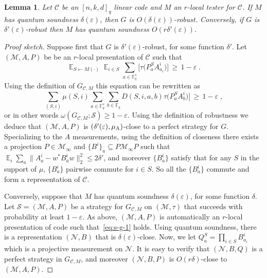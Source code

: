 \documentclass[11pt]{article}
\newtheorem{lemma}[theorem]{Lemma}
\theoremstyle{definition}
\newcommand{\code}{\mathcal{C}}
\newcommand{\strategy}{\mathscr{S}}
\DeclareMathOperator*{\Expectation}{\mathbb{E}}
\newcommand{\Es}[1]{\Expectation_{#1}}
\newcommand{\F}{\ensuremath{\mathbb{F}}}
\newcommand{\mM}{\ensuremath{\mathcal{M}}}
\newcommand{\eps}{\varepsilon}
\newcommand{\mN}{\mathcal{N}}
\newcommand{\labelstyle}[1]{\ensuremath{\textsc{#1}}\xspace}
\newcommand{\alice}{\labelstyle{A}}
\begin{document}

\begin{lemma}\label{lem:sound-game}
Let $\code$ be an $[n,k,d]_q$ linear code and $M$ an $r$-local tester for $\code$. 
If $M$ has quantum soundness $\delta(\eps)$, then $G$ is $O(\delta(\eps))$-robust. Conversely, if $G$ is $\delta'(\eps)$-robust then $M$ has quantum soundness $O(r\delta'(\eps))$. 
\end{lemma}

\begin{proof}[Proof sketch]
Suppose first that $G$ is $\delta'(\eps)$-robust, for some function $\delta'$. Let $(\mM,A,P)$ be be an $r$-local presentation of $\code$ such that 
\begin{equation}\label{eq:s-g-1}
\Es{S\leftarrow M(\cdot)} \Es{i\in S} \sum_{a\in \F_q^s} \big[ \tau\big(  P^S_a  A^i_{a_i}\big) \big] \,\geq \,1-\eps\;.
\end{equation}
Using the definition of $G_{\code,M}$ this equation can be rewritten as
\[ \sum_{(S,i)} \mu(S,i) \sum_{a\in \F_q^s}\sum_{b\in\F_q} D(S,i,a,b) \tau\big(  P^S_a  A^i_{b}\big) \big] \,\geq \,1-\eps\;,\]
or in other words $\omega(G_{\code,M};\strategy)\geq 1-\eps$. Using the definition of robustness we deduce that $(\mM,A,P)$ is $(\delta'(\eps),\mu_\alice)$-close to a perfect strategy for $G$. Specializing to the $A$ measurements, using the definition of closeness there exists a projection $P\in \mM_\infty$ and $\{B^i\}_a \subseteq P\mM_\infty P$ such that $\Es{i}\sum_a \|A^i_a-w^* B^i_a w \|_2^2 \leq 2\delta'$, and moreover $\{B^i_a\}$ satisfy that for any $S$ in the support of $\mu$, $\{B^i_a\}$ pairwise commute for $i\in S$. So all the $\{B^i_a\}$ commute and form a representation of $\code$. 

Conversely, suppose that $M$ has quantum soundness $\delta(\eps)$, for some function $\delta$.
Let $\strategy=(\mM,A,P)$ be a strategy for $G_{\code,M}$ on $(\mM,\tau)$ that succeeds with probability at least $1-\eps$. As above, $(\mM,A,P)$ is automatically an $r$-local presentation of code such that~\eqref{eq:s-g-1} holds. Using quantum soundness, there is a representation $(\mN,B)$ that is $\delta(\eps)$-close. Now, we let $Q^S_a = \prod_{i\in S} B^i_{a_i}$ which is a projective measurement on $\mN$. It is easy to verify that $(\mN,B,Q)$ is a perfect strategy in $G_{\code,M}$, and moreover $(\mN,B,P)$ is $O(r\delta)$-close to $(\mM,A,P)$.
\end{proof}
\end{document}
